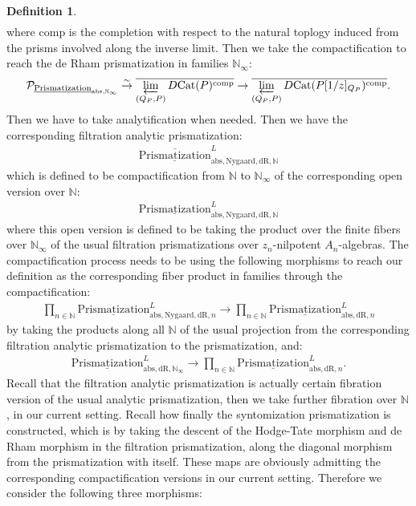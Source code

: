\documentclass[12pt]{article}
\theoremstyle{definition}
\newtheorem{definition}{Definition}
\begin{document}
\begin{definition}
\begin{align}
\end{align}
where $\mathrm{comp}$ is the completion with respect to the natural toplogy induced from the prisms involved along the inverse limit. Then we take the compactification to reach the de Rham prismatization in families $\mathbb{N}_\infty$:
\begin{align}
\mathcal{P}_{\underline{\mathrm{Prismatization}}_{\mathrm{abs},\mathbb{N}_\infty}} \overset{\sim}{\rightarrow} \overline{\varprojlim_{(Q_P,P)} D\mathrm{Cat}(P)^\mathrm{comp}}\rightarrow \overline{\varprojlim_{(Q_P,P)} D\mathrm{Cat}(P[1/z]_{Q_P})^\mathrm{comp}}.
\end{align}
Then we have to take analytification when needed. Then we have the corresponding filtration analytic prismatization:
\begin{align}
\overline{\underline{\mathrm{Prismatization}}}^L_{\mathrm{abs},\mathrm{Nygaard},\mathrm{dR},\mathbb{N}}
\end{align}
which is defined to be compactification from $\mathbb{N}$ to $\mathbb{N}_\infty$ of the corresponding open version over $\mathbb{N}$:
\begin{align}
{\underline{\mathrm{Prismatization}}}^L_{\mathrm{abs},\mathrm{Nygaard},\mathrm{dR},\mathbb{N}}
\end{align}
where this open version is defined to be taking the product over the finite fibers over $\mathbb{N}_\infty$ of the usual filtration prismatizations over $z_n$-nilpotent $A_n$-algebras. The compactification process needs to be using the following morphisms to reach our definition as the corresponding fiber product in families through the compactification:
\begin{align}
\prod_{n\in \mathbb{N}} {\underline{\mathrm{Prismatization}}}^L_{\mathrm{abs},\mathrm{Nygaard},\mathrm{dR},n}\rightarrow  \prod_{n\in \mathbb{N}} {\underline{\mathrm{Prismatization}}}^L_{\mathrm{abs},\mathrm{dR},n}
\end{align}
by taking the products along all $\mathbb{N}$ of the usual projection from the corresponding filtration analytic prismatization to the prismatization, and:
\begin{align}
{\underline{\mathrm{Prismatization}}}^L_{\mathrm{abs},\mathrm{dR},\mathbb{N}_\infty}\rightarrow  \prod_{n\in \mathbb{N}} {\underline{\mathrm{Prismatization}}}^L_{\mathrm{abs},\mathrm{dR},n}.
\end{align}
Recall that the filtration analytic prismatization is actually certain fibration version of the usual analytic prismatization, then we take further fibration over $\mathbb{N}$, in our current setting. Recall how finally the syntomization prismatization is constructed, which is by taking the descent of the Hodge-Tate morphism and de Rham morphism in the filtration prismatization, along the diagonal morphism from the prismatization with itself. These maps are obviously admitting the corresponding compactification versions in our current setting. Therefore we consider the following three morphisms:

\end{definition}
\end{document}
